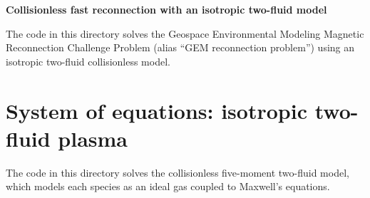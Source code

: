 \documentclass[12pt,fleqn]{article}
\numberwithin{equation}{section}
\begin{document}
\noindent
{\Large \bf Collisionless fast reconnection with an isotropic two-fluid model}

The code in this directory solves 
the Geospace Environmental Modeling Magnetic Reconnection
Challenge Problem (alias ``GEM reconnection problem'') \cite{article:Birn01}
using an isotropic two-fluid collisionless model.


\section{System of equations: isotropic two-fluid plasma}

The code in this directory solves
the collisionless five-moment two-fluid model,
which models each species as an ideal gas
coupled to Maxwell's equations.
\end{document}
